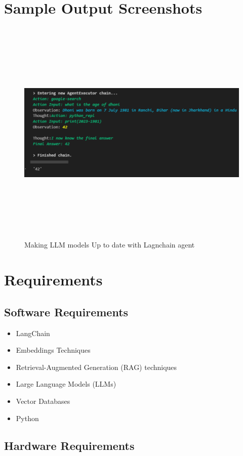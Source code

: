 \documentclass[12pt,a4paper,oneside]{report}
\begin{document}
\section{Sample Output Screenshots}

\begin{figure}[ht]
    \centering
    \includegraphics[width=145mm , height = 110mm]{Dhoni.png}
    \caption{Making LLM models Up to date with Lagnchain agent}
    \label{fig:figure2_2}
\end{figure}


\section{Requirements}
\subsection{Software Requirements}
\begin{itemize}
\item{LangChain}
\item{Embeddings Techniques}
\item{Retrieval-Augmented Generation (RAG) techniques}
\item{Large Language Models (LLMs)}
\item{Vector Databases}
\item{Python}
\end{itemize}

\subsection{Hardware Requirements}
\end{document}
